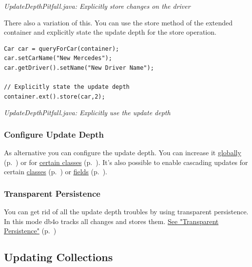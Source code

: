 {\small\itshape UpdateDepthPitfall.java: Explicitly store changes on the driver\par}
\medskip

There also a variation of this. You can use the store method of the extended container and explicitly state the update depth for the store operation.

\begin{lstlisting}
Car car = queryForCar(container);
car.setCarName("New Mercedes");
car.getDriver().setName("New Driver Name");

// Explicitly state the update depth
container.ext().store(car,2);
\end{lstlisting}

{\small\itshape UpdateDepthPitfall.java: Explicitly use the update depth\par}
\medskip

\subsubsection*{Configure Update Depth}

As alternative you can configure the update depth. You can increase it \hyperref[ref:configuration-common-update-depth]{globally} (p.~\pageref{ref:configuration-common-update-depth}) or for \hyperref[ref:configuration-objectclass-update-depth]{certain classes} (p.~\pageref{ref:configuration-objectclass-update-depth}). It's also possible to enable cascading updates for certain \hyperref[ref:configuration-objectclass-cascade-on-update]{classes} (p.~\pageref{ref:configuration-objectclass-cascade-on-update}) or \hyperref[ref:configuration-objectfield-configuration]{fields} (p.~\pageref{ref:configuration-objectfield-configuration}).

\subsubsection*{Transparent Persistence}

You can get rid of all the update depth troubles by using transparent persistence. In this mode db4o tracks all changes and stores them. \hyperref[ref:basics-update-concept-transparent-persistence]{See "Transparent Persistence"} (p.~\pageref{ref:basics-update-concept-transparent-persistence})

\subsection{Updating Collections}
\label{ref:basics-update-concept-updating-collections}

